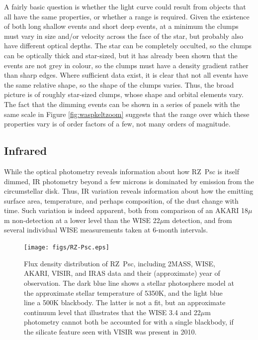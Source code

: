 \documentclass[]{rsos}
\begin{document}
A fairly basic question is whether the light curve could result from objects that all
have the same properties, or whether a range is required. Given the existence of both
long shallow events and short deep events, at a minimum the clumps must vary in size
and/or velocity across the face of the star, but probably also have different optical
depths. The star can be completely occulted, so the clumps can be optically thick and
star-sized, but it has already been shown that the events are not grey in colour, so the
clumps must have a density gradient rather than sharp edges. Where sufficient data exist,
it is clear that not all events have the same relative shape, so the shape of the clumps
varies. Thus, the broad picture is of roughly star-sized clumps, whose shape and orbital
elements vary. The fact that the dimming events can be shown in a series of panels with
the same scale in Figure \ref{fig:waspkeltzoom} suggests that the range over which these
properties vary is of order factors of a few, not many orders of magnitude.

\subsection{Infrared}\label{ss:ir}

While the optical photometry reveals information about how RZ~Psc is itself dimmed, IR
photometry beyond a few microns is dominated by emission from the circumstellar
disk. Thus, IR variation reveals information about how the emitting surface area,
temperature, and perhaps composition, of the dust change with time. Such variation is
indeed apparent, both from comparison of an AKARI 18$\mu$m non-detection at a lower level
than the WISE 22$\mu$m detection, and from several individual WISE measurements taken at
6-month intervals.

\begin{figure}
  \begin{center}
    \hspace{-0.5cm} \texttt{[image: figs/RZ-Psc.eps]}
    \caption{Flux density distribution of RZ~Psc, including 2MASS, WISE, AKARI, VISIR,
      and IRAS data and their (approximate) year of observation. The dark blue line shows
      a stellar photosphere model at the approximate stellar temperature of 5350K, and
      the light blue line a 500K blackbody. The latter is not a fit, but an approximate
      continuum level that illustrates that the WISE 3.4 and 22$\mu$m photometry cannot
      both be accounted for with a single blackbody, if the silicate feature seen with
      VISIR was present in 2010.}\label{fig:sed}
  \end{center}
\end{figure}
\end{document}
